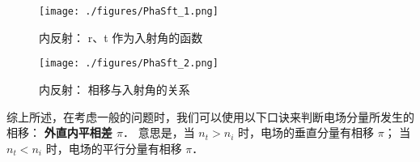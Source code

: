 \begin{figure}[ht]
\centering
\texttt{[image: ./figures/PhaSft\_1.png]}
\caption{内反射： r、t 作为入射角的函数} \label{PhaSft_fig1}
\end{figure}

\begin{figure}[ht]
\centering
\texttt{[image: ./figures/PhaSft\_2.png]}
\caption{内反射： 相移与入射角的关系} \label{PhaSft_fig2}
\end{figure}



综上所述，在考虑一般的问题时，我们可以使用以下口诀来判断电场分量所发生的相移： 
\textbf{外直内平相差 $\pi$}．
意思是，当 $n_t > n_i$ 时，电场的垂直分量有相移 $\pi$； 当 $n_t < n_i$ 时，电场的平行分量有相移 $\pi$．



